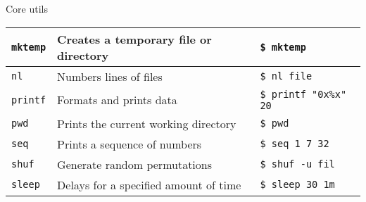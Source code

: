 \documentclass{beamer}
\let\tt\texttt
\begin{document}
\begin{frame}{Core utils}
        \begin{tabular}{p{} p{} p{}}
                \hline
                \tt{mktemp}             &
                Creates a temporary file or directory &
                \tt{\$ mktemp }       \\
                \hline
                \tt{nl}             &
                Numbers lines of files &
                \tt{\$ nl file}       \\
                \hline
                \tt{printf}             &
                Formats and prints data  &
                \tt{\$ printf "0x\%x" 20}       \\
                \hline
                \tt{pwd}             &
                Prints the current working directory &
                \tt{\$ pwd}       \\
                \hline
                \tt{seq}             &
                Prints a sequence of numbers  &
                \tt{\$ seq 1 7 32}       \\
                \hline
                \tt{shuf}             &
                Generate random permutations &
                \tt{\$ shuf -u fil}       \\
                \hline
                \tt{sleep}             &
                Delays for a specified amount of time &
                \tt{\$ sleep 30 1m}       \\
                \hline
        \end{tabular}
\end{frame}
\end{document}

